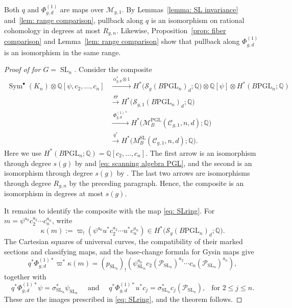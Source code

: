 \documentclass[11pt,reqno]{amsart}
\theoremstyle{plain} %
\theoremstyle{definition}
\newcommand{\QQ}{\mathbb{Q}}
\newcommand{\M}{\mathcal{M}}
\newcommand{\C}{\mathcal{C}}
\DeclareMathOperator{\SL}{SL}
\DeclareMathOperator{\PGL}{PGL}
\newcommand{\BPGL}{B\mathrm{PGL}}
\DeclareMathOperator{\Sym}{Sym}
\newcommand{\Sc}{\mathcal{S}}
\begin{document}
Both $q$ and $\Phi^{(1)}_{g,d}$ are maps over $\M_{g,1}$. By Lemmas~\ref{lemma: SL invariance} and~\ref{lem: range comparison}, pullback along $q$ is an isomorphism on rational cohomology in degrees at most $R_{g,n}$. Likewise, Proposition~\ref{prop: fiber comparison} and Lemma~\ref{lem: range comparison} show that pullback along $\Phi^{(1)}_{g,d}$ is an isomorphism in the same range.

\begin{proof}[Proof of  for $G=\SL_n$]
Consider the composite
\[
\begin{aligned}
\Sym^\bullet(K_n)\otimes\QQ[\psi,c_2,\dots,c_n]
&\xrightarrow{\ \alpha_{g,d}^*\otimes 1\ }
H^*\big(\Sc_g(\BPGL_n)_d;\QQ\big)
    \otimes\QQ[\psi]\otimes H^*(\BPGL_n;\QQ)
\\
&\xrightarrow{\ \Theta\ }
H^*\big(\Sc_{g,1}(\BPGL_n)_d;\QQ\big)
\\
&\xrightarrow{\ \Phi_{g,d}^{(1)*}\ }
H^*\big(\M_B^{\PGL}(\C_{g,1},n,d);\QQ\big)
\\
&\xrightarrow{\ q^*\ }
H^*\big(M_B^{\SL}(\C_{g,1},n,d);\QQ\big).
\end{aligned}
\]
Here we use $H^*(\BPGL_n;\QQ)=\QQ[c_2,\dots,c_n]$. The first arrow is an isomorphism through degree $s(g)$ by  and \eqref{eq: scanning algebra PGL}, and the second is an isomorphism through degree $s(g)$ by . The last two arrows are isomorphisms through degree $R_{g,n}$ by the preceding paragraph. Hence, the composite is an isomorphism in degrees at most $s(g)$.

It remains to identify the composite with the map \eqref{eq: SLring}. For $m=\psi^{a_0}c_2^{a_2}\cdots c_n^{a_n}$,
write
\[
\kappa(m):=
\varpi_!\left(
\psi^{a_0}u^*c_2^{a_2}\cdots u^*c_n^{a_n}
\right)
\in H^*\big(\Sc_g(\BPGL_n)_d;\QQ\big).
\]
The Cartesian squares of universal curves, the compatibility of their marked sections and classifying maps, and the base-change formula for Gysin maps give
\[
q^*\Phi_{g,d}^{(1)*}\varpi^*\kappa(m)
=
(p_{\SL_n})_!\left(
\psi_{\SL_n}^{a_0}
c_2(\mathcal P_{\SL_n})^{a_2}\cdots
c_n(\mathcal P_{\SL_n})^{a_n}
\right),
\]
together with
\[
q^*\Phi_{g,d}^{(1)*}\psi
=
\sigma_{\SL_n}^*\psi_{\SL_n}
\quad \mbox{ and }
\quad 
q^*\Phi_{g,d}^{(1)*}u^*c_j
=
\sigma_{\SL_n}^*c_j(\mathcal P_{\SL_n}),
\ \  \mbox{ for \ } 2\leq j\leq n.
\]
These are the images prescribed in \eqref{eq: SLring}, and the theorem follows.
\end{proof}
\end{document}

